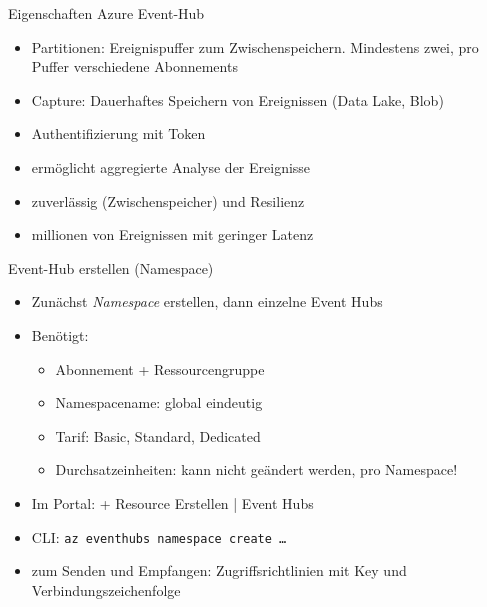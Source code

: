 \begin{flashcard}[Definition]{Eigenschaften Azure Event-Hub}
    \begin{itemize}
        \item Partitionen:\newline
            Ereignispuffer zum Zwischenspeichern. Mindestens zwei, pro Puffer verschiedene Abonnements
        \item Capture:\newline
            Dauerhaftes Speichern von Ereignissen (Data Lake, Blob)
        \item Authentifizierung mit Token
        \item ermöglicht aggregierte Analyse der Ereignisse
        \item zuverlässig (Zwischenspeicher) und Resilienz
        \item millionen von Ereignissen mit geringer Latenz
    \end{itemize}
\end{flashcard}

\begin{flashcard}[Definition]{Event-Hub erstellen (Namespace)}
    \begin{itemize}
        \item Zunächst \emph{Namespace} erstellen, dann einzelne Event Hubs
        \item Benötigt:
            \begin{itemize}
                \item Abonnement + Ressourcengruppe
                \item Namespacename: global eindeutig
                \item Tarif: Basic, Standard, Dedicated
                \item Durchsatzeinheiten: kann nicht geändert werden, pro Namespace!
            \end{itemize}
        \item Im Portal: {+ Resource Erstellen | Event Hubs}
        \item CLI: \texttt{az eventhubs namespace create \ldots}
        \item zum Senden und Empfangen: Zugriffsrichtlinien mit Key und Verbindungszeichenfolge
    \end{itemize}
\end{flashcard}

